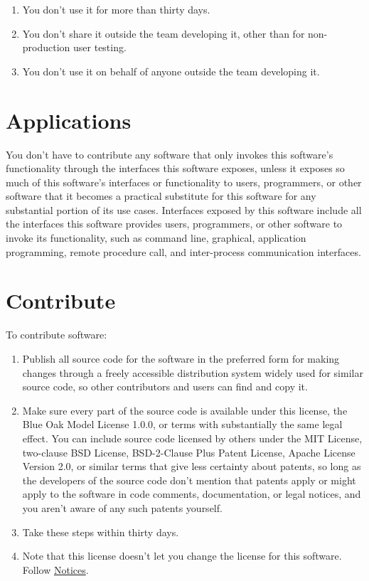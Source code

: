 \documentclass[12pt,letterpaper]{article}
\begin{document}
\begin{enumerate}
\item You don't use it for more than thirty days.
\item You don't share it outside the team developing it, other than for non-production user testing.
\item You don't use it on behalf of anyone outside the team developing it.
\end{enumerate}

\hypertarget{Applications}{\section*{Applications}}

You don't have to contribute any software that only invokes this software's functionality through the interfaces this software exposes, unless it exposes so much of this software's interfaces or functionality to users, programmers, or other software that it becomes a practical substitute for this software for any substantial portion of its use cases. Interfaces exposed by this software include all the interfaces this software provides users, programmers, or other software to invoke its functionality, such as command line, graphical, application programming, remote procedure call, and inter-process communication interfaces.

\section*{Contribute}

To contribute software:

\begin{enumerate}
\item Publish all source code for the software in the preferred form for making changes through a freely accessible distribution system widely used for similar source code, so other contributors and users can find and copy it.
\item Make sure every part of the source code is available under this license, the Blue Oak Model License 1.0.0, or terms with substantially the same legal effect. You can include source code licensed by others under the MIT License, two-clause BSD License, BSD-2-Clause Plus Patent License, Apache License Version 2.0, or similar terms that give less certainty about patents, so long as the developers of the source code don't mention that patents apply or might apply to the software in code comments, documentation, or legal notices, and you aren't aware of any such patents yourself.
\item Take these steps within thirty days.
\item Note that this license doesn't let you change the license for this software. Follow \hyperlink{Notices}{Notices}.
\end{enumerate}
\end{document}
